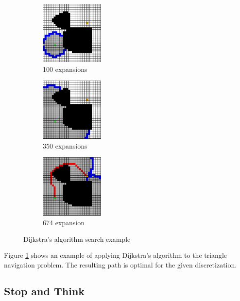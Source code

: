 \begin{figure}
\begin{center}
    \begin{subfigure}[t]{0.3\textwidth}
      \includegraphics[width=1.25in]{planning/figs/dijkstra_0100.pdf}
       \caption{100 expansions}
    \end{subfigure}
    \begin{subfigure}[t]{0.3\textwidth}
      \includegraphics[width=1.25in]{planning/figs/dijkstra_0350.pdf}
       \caption{350 expansions}
    \end{subfigure}
    \begin{subfigure}[t]{0.3\textwidth}
      \includegraphics[width=1.25in]{planning/figs/dijkstra_0674.pdf}
       \caption{674 expansion}
    \end{subfigure}



\end{center}
\caption{Dijkstra's algorithm search example}
\label{fig:dijkstra}
\end{figure}


Figure \ref{fig:dijkstra} shows an example of applying Dijkstra's
algorithm to the triangle navigation problem.  The resulting path is
optimal for the given discretization.

\subsection*{Stop and Think}

